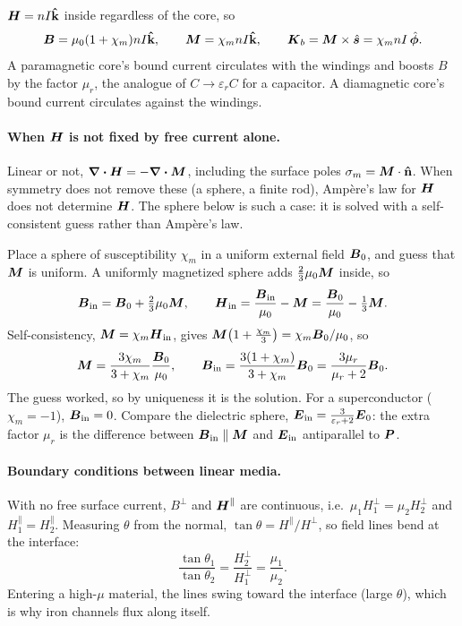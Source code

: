 \begin{example}
$\vect{H} = nI\khat$ inside regardless of the core, so
\[
    \vect{B} = \mu_0(1+\chi_m)nI\khat,
    \qquad
    \vect{M} = \chi_mnI\khat,
    \qquad
    \vect{K}_b = \vect{M}\times\hat{\lvect{s}} = \chi_mnI\,\hat{\boldsymbol{\phi}}.
\]
A paramagnetic core's bound current circulates with the windings and boosts $B$ by the factor $\mu_r$, the analogue of $C\to\varepsilon_rC$ for a capacitor. A diamagnetic core's bound current circulates against the windings.
\end{example}

\paragraph{When $\vect{H}$ is not fixed by free current alone.} Linear or not, $\div\vect{H} = -\div\vect{M}$, including the surface poles $\sigma_m = \vect{M}\cdot\uvect{n}$. When symmetry does not remove these (a sphere, a finite rod), Amp\`ere's law for $\vect{H}$ does not determine $\vect{H}$. The sphere below is such a case: it is solved with a self-consistent guess rather than Amp\`ere's law.

\begin{example}
Place a sphere of susceptibility $\chi_m$ in a uniform external field $\vect{B}_0$, and guess that $\vect{M}$ is uniform. A uniformly magnetized sphere adds $\frac23\mu_0\vect{M}$ inside, so
\[
    \vect{B}_{\text{in}} = \vect{B}_0 + \tfrac23\mu_0\vect{M},
    \qquad
    \vect{H}_{\text{in}} = \frac{\vect{B}_{\text{in}}}{\mu_0} - \vect{M} = \frac{\vect{B}_0}{\mu_0} - \tfrac13\vect{M}.
\]
Self-consistency, $\vect{M} = \chi_m\vect{H}_{\text{in}}$, gives $\vect{M}\bigl(1+\frac{\chi_m}{3}\bigr) = \chi_m\vect{B}_0/\mu_0$, so
\[
    \vect{M} = \frac{3\chi_m}{3+\chi_m}\frac{\vect{B}_0}{\mu_0},
    \qquad
    \vect{B}_{\text{in}} = \frac{3(1+\chi_m)}{3+\chi_m}\vect{B}_0 = \frac{3\mu_r}{\mu_r+2}\vect{B}_0 .
\]
The guess worked, so by uniqueness it is the solution. For a superconductor ($\chi_m = -1$), $\vect{B}_{\text{in}} = 0$. Compare the dielectric sphere, $\vect{E}_{\text{in}} = \frac{3}{\varepsilon_r+2}\vect{E}_0$: the extra factor $\mu_r$ is the difference between $\vect{B}_{\text{in}}\parallel\vect{M}$ and $\vect{E}_{\text{in}}$ antiparallel to $\vect{P}$.
\end{example}

\paragraph{Boundary conditions between linear media.} With no free surface current, $B^\perp$ and $\vect{H}^\parallel$ are continuous, i.e.\ $\mu_1H_1^\perp = \mu_2H_2^\perp$ and $H_1^\parallel = H_2^\parallel$. Measuring $\theta$ from the normal, $\tan\theta = H^\parallel/H^\perp$, so field lines bend at the interface:
\[
    \frac{\tan\theta_1}{\tan\theta_2} = \frac{H_2^\perp}{H_1^\perp} = \frac{\mu_1}{\mu_2}.
\]
Entering a high-$\mu$ material, the lines swing toward the interface (large $\theta$), which is why iron channels flux along itself.

